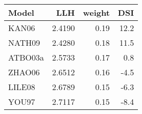 \begin{tabular}{lrrr}
\toprule
   Model &     LLH &  weight &   DSI \\
\midrule
   KAN06 &  2.4190 &    0.19 &  12.2 \\
  NATH09 &  2.4280 &    0.18 &  11.5 \\
 ATBO03a &  2.5733 &    0.17 &   0.8 \\
  ZHAO06 &  2.6512 &    0.16 &  -4.5 \\
  LILE08 &  2.6789 &    0.15 &  -6.3 \\
   YOU97 &  2.7117 &    0.15 &  -8.4 \\
\bottomrule
\end{tabular}
